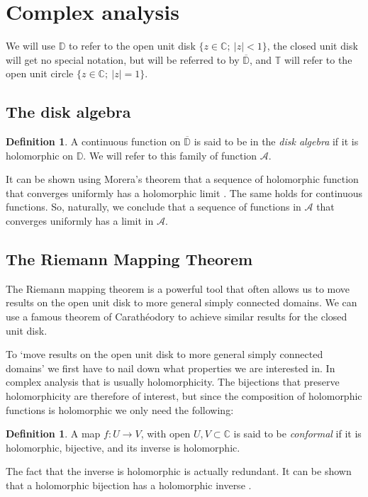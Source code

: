 \documentclass[a4paper,12pt,twoside,BCOR=10mm]{scrbook}
\theoremstyle{definition}
\theoremstyle{definition}
\theoremstyle{definition}
\newtheorem{definition}[theorem]{Definition}
\begin{document}
\section{Complex analysis}
\label{index5}
We will use $\mathbb{D}$ to refer to the open unit disk $\{z \in \mathbb{C};\ |z| < 1\}$,
	the closed unit disk will get no special notation, but will be referred to by $\overline{\mathbb{D}}$,
	and $\mathbb{T}$ will refer to the open unit circle $\{z \in \mathbb{C};\ |z| = 1\}$.
\subsection{The disk algebra}
\begin{definition}
\label{index4}
A continuous function on $\overline{\mathbb{D}}$ is said to be in the \emph{disk algebra} if it is holomorphic on $\mathbb{D}$.
We will refer to this family of function $\mathcal{A}$.
\end{definition}
It can be shown using Morera's theorem that a sequence of holomorphic function that converges uniformly has a holomorphic limit \citep{reynir}.
The same holds for continuous functions.
So, naturally, we conclude that a sequence of functions in $\mathcal{A}$ that converges uniformly has a limit in $\mathcal{A}$.
\subsection{The Riemann Mapping Theorem} 
The Riemann mapping theorem is a powerful tool that often allows us to move results on the open unit disk to more general simply connected domains.
We can use a famous theorem of Carathéodory to achieve similar results for the closed unit disk.

To `move results on the open unit disk to more general simply connected domains' we first have to nail down what properties we are interested in.
In complex analysis that is usually holomorphicity.
The bijections that preserve holomorphicity are therefore of interest, but since the composition of holomorphic functions is holomorphic we only need the following:
\begin{definition}
\label{index6}
A map $f: U \rightarrow V$, with open $U, V \subset \mathbb{C}$ is said to be \emph{conformal} if it is holomorphic, bijective, and its inverse is holomorphic.
\end{definition}
The fact that the inverse is holomorphic is actually redundant.
It can be shown that a holomorphic bijection has a holomorphic inverse \citep{greenkrantz}.
\end{document}
